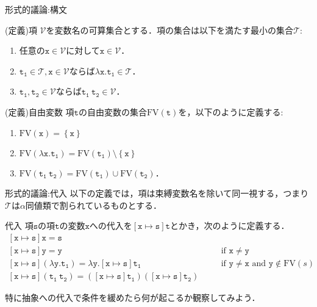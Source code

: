 \documentclass[9pt]{beamer}
\begin{document}
\begin{frame}{形式的議論:構文}
	\begin{dblock}{(定義)項}
		$\mathcal{V}$を変数名の可算集合とする．項の集合は以下を満たす最小の集合$\mathcal{T}$:\begin{enumerate}
			\item 任意の$\mathtt{x}\in\mathcal{V}$に対して$\mathtt{x}\in\mathcal{V}$．
			\item $\mathtt{t_{1}}\in\mathcal{T}, \mathtt{x}\in\mathcal{V}$ならば$\mathtt{\lambda x. t_{1}}\in\mathcal{T}$．
			\item $\mathtt{t_{1}, t_{2}}\in\mathcal{V}$ならば$\mathtt{t_{1}\ t_{2}}\in\mathcal{V}$．
		\end{enumerate}
	\end{dblock}
	\begin{dblock}{(定義)自由変数}
		項$\mathtt{t}$の自由変数の集合$\mathrm{FV}(\mathtt{t})$を，以下のように定義する:
		\begin{enumerate}
			\item $\mathrm{FV}(\mathtt{x}) =\left\{\mathtt{x}\right\}$
			\item $\mathrm{FV}(\mathtt{\lambda x. t_{1}}) = \mathrm{FV}(\mathtt{t_{1}})\setminus \left\{\mathtt{x}\right\}$
			\item $\mathrm{FV}(\mathtt{t_{1}\ t_{2}}) = \mathrm{FV}(\mathtt{t_{1}})\cup \mathrm{FV}(\mathtt{t_{2}})$．
		\end{enumerate}
	\end{dblock}
\end{frame}
\begin{frame}{形式的議論:代入}
以下の定義では，項は束縛変数名を除いて同一視する，つまり$\mathcal{T}$は$\alpha$同値類で割られているものとする．
\begin{dblock}{代入}
	項$\mathtt{s}$の項$\mathtt{t}$の変数$\mathtt{x}$への代入を$\left[\mathtt{x}\mapsto \mathtt{s}\right]\mathtt{t}$とかき，次のように定義する．\begin{align*}
		\left[\mathtt{x}\mapsto\mathtt{s}\right]\mathtt{x} = \mathtt{s}&&\\
		\left[\mathtt{x}\mapsto\mathtt{s}\right]\mathtt{y} = \mathtt{y}&\quad&\text{if $\mathtt{x\neq y}$}\\
		\left[\mathtt{x}\mapsto\mathtt{s}\right]\mathtt{(\lambda y. t_{1})} = \mathtt{\lambda y. \left[x\mapsto s\right]t_{1}}&\quad&\text{if $\mathtt{y\neq x}$ and $\mathtt{y}\notin\mathrm{FV}(s)$}\\
		\left[\mathtt{x}\mapsto\mathtt{s}\right](\mathtt{t_{1}\ t_{2}}) = (\left[\mathtt{x}\mapsto\mathtt{s}\right]\mathtt{t_{1}})(\left[\mathtt{x}\mapsto\mathtt{s}\right]\mathtt{t_{2}})
	\end{align*}
\end{dblock}
特に抽象への代入で条件を緩めたら何が起こるか観察してみよう．
\end{frame}
\end{document}
